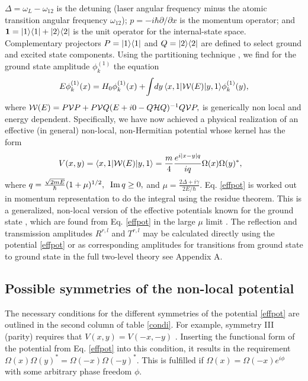 $\Delta=\omega_{L}-\omega_{12}$
is the detuning (laser angular frequency minus the atomic transition
angular frequency $\omega_{12}$);
${p}=-i\hbar\partial/\partial x$ is the momentum operator;
and ${\bf 1}=|1\rangle\langle 1|+|2\rangle\langle 2|$ is the unit operator
for the internal-state space.
Complementary projectors
%
$P=|1\rangle\langle 1|$ and $Q=|2\rangle\langle 2|$
%
are defined to select ground and excited state components.
Using the partitioning
technique \cite{Feshbach1958,Feshbach1962,Levine1969},
we find for the ground
state amplitude $\phi_k^{(1)}$ the equation
%
\begin{equation}\label{effecti}
	E\phi_k^{(1)}(x) = H_0\phi_k^{(1)}(x)+\!
	\int\! dy\, \la x,1|{\cal W}(E)|y,1\ra \phi_k^{(1)}(y),
\end{equation}
%
where
%
$
{\cal W}(E)=P{\cal V}P+P{\cal V}Q(E+i0-Q{\cal H}Q)^{-1}Q{\cal V}P,
$
%
is generically non local and energy dependent. Specifically, we have now achieved
a physical realization of an effective (in general) non-local, non-Hermitian potential whose kernel has the form
%
\begin{eqnarray}
	\hspace*{-.3cm}V (x,y) = \la x,1|{\cal W}(E)|y,1\ra = \frac{m}{4} \frac{e^{i|x-y|q}}{i q}
	\Omega(x)\Omega(y)^*,
	\label{effpot}
\end{eqnarray}
%
%
where
$
q=\frac{\sqrt{2mE}}{\hbar}(1+\mu)^{1/2},\;\;
{\rm Im}\,q\ge 0,
\label{qeq}
$ and
$
\mu=\frac{2\Delta+i\gamma}{2E/\hbar}.
$
%
Eq. \eqref{effpot} is worked out  in momentum representation to do the integral
using the residue theorem.
This is a generalized, non-local version of the effective potentials known for the ground state
\cite{Chudesnikov1991,Oberthaler1996}, which are found from Eq. \eqref{effpot}  in the large $\mu$ limit \cite{Ruschhaupt2004a}.
The reflection and transmission amplitudes $R^{r,l}$ and  $T^{r,l}$ may be calculated directly
using  the potential  \eqref{effpot} or as  corresponding amplitudes for
transitions from ground state to ground state in the full two-level theory see Appendix A.


%
\subsection{Possible symmetries of the non-local potential}
%
The necessary conditions for the different symmetries of the potential \eqref{effpot} are outlined in the second column of  table \ref{condi}. For example,
symmetry III (parity) requires that $V(x,y)=V(-x,-y)$ \cite{Ruschhaupt2017}. Inserting the functional form of the potential from Eq. \eqref{effpot} into this condition, it results in the requirement $\Omega(x) \Omega(y)^* = \Omega(-x) \Omega(-y)^*$. This is fulfilled if $\Omega(x)=\Omega(-x)e^{i \phi}$ with some arbitrary phase freedom $\phi$.

